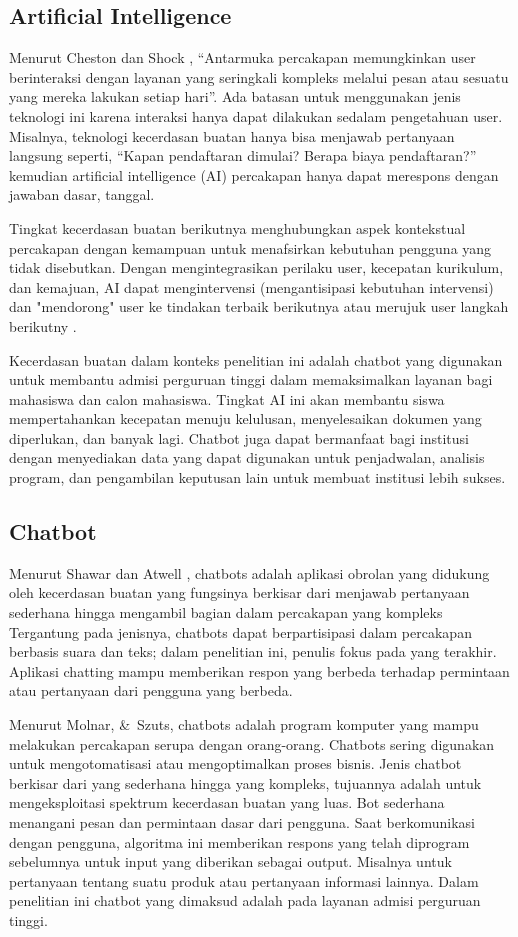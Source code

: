 \documentclass[conference]{IEEEtran}
\begin{document}
\subsection{Artificial Intelligence}
Menurut Cheston dan Shock \cite{b13}, “Antarmuka percakapan memungkinkan user berinteraksi dengan layanan yang seringkali kompleks melalui pesan atau sesuatu yang mereka lakukan setiap hari”. Ada batasan untuk menggunakan jenis teknologi ini karena interaksi hanya dapat dilakukan sedalam pengetahuan user. Misalnya, teknologi kecerdasan buatan hanya bisa menjawab pertanyaan langsung seperti, “Kapan pendaftaran dimulai? Berapa biaya pendaftaran?” kemudian artificial intelligence (AI) percakapan hanya dapat merespons dengan jawaban dasar, tanggal.

Tingkat kecerdasan buatan berikutnya menghubungkan aspek kontekstual percakapan dengan kemampuan untuk menafsirkan kebutuhan pengguna yang tidak disebutkan. Dengan mengintegrasikan perilaku user, kecepatan kurikulum, dan kemajuan, AI dapat mengintervensi (mengantisipasi kebutuhan intervensi) dan "mendorong" user ke tindakan terbaik berikutnya atau merujuk user langkah berikutny \cite{b14}.

Kecerdasan buatan dalam konteks penelitian ini adalah chatbot yang digunakan untuk membantu admisi perguruan tinggi dalam memaksimalkan layanan bagi mahasiswa dan calon mahasiswa. Tingkat AI ini akan membantu siswa mempertahankan kecepatan menuju kelulusan, menyelesaikan dokumen yang diperlukan, dan banyak lagi. Chatbot juga dapat bermanfaat bagi institusi dengan menyediakan data yang dapat digunakan untuk penjadwalan, analisis program, dan pengambilan keputusan lain untuk membuat institusi lebih sukses.

\subsection{Chatbot}
Menurut Shawar dan Atwell \cite{b15}, chatbots adalah aplikasi obrolan yang didukung oleh kecerdasan buatan yang fungsinya berkisar dari menjawab pertanyaan sederhana hingga mengambil bagian dalam percakapan yang kompleks 
Tergantung pada jenisnya, chatbots dapat berpartisipasi dalam percakapan berbasis suara dan teks; dalam penelitian ini, penulis fokus pada yang terakhir. Aplikasi chatting mampu memberikan respon yang berbeda terhadap permintaan atau pertanyaan dari pengguna yang berbeda.

Menurut Molnar, \&\ Szuts, \cite{b17}  chatbots adalah program komputer yang mampu melakukan percakapan serupa dengan orang-orang. Chatbots sering digunakan untuk mengotomatisasi atau mengoptimalkan proses bisnis. Jenis chatbot berkisar dari yang sederhana hingga yang kompleks, tujuannya adalah untuk mengeksploitasi spektrum kecerdasan buatan yang luas. Bot sederhana menangani pesan dan permintaan dasar dari pengguna. Saat berkomunikasi dengan pengguna, algoritma ini memberikan respons yang telah diprogram sebelumnya untuk input yang diberikan sebagai output. Misalnya untuk pertanyaan tentang suatu produk atau pertanyaan informasi lainnya. Dalam penelitian ini chatbot yang dimaksud adalah pada layanan admisi perguruan tinggi. 
\end{document}

